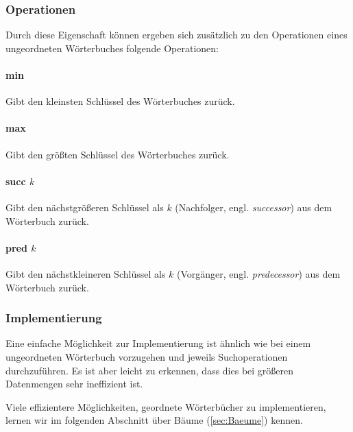 \subsubsection{Operationen}
Durch diese Eigenschaft können ergeben sich zusätzlich zu den Operationen eines ungeordneten Wörterbuches folgende Operationen:

\paragraph{min} Gibt den kleinsten Schlüssel des Wörterbuches zurück.
\paragraph{max} Gibt den größten Schlüssel des Wörterbuches zurück.
\paragraph{succ $k$} Gibt den nächstgrößeren Schlüssel als $k$ (Nachfolger, engl. \textit{successor}) aus dem Wörterbuch zurück.
\paragraph{pred $k$} Gibt den nächstkleineren Schlüssel als $k$ (Vorgänger, engl. \textit{predecessor}) aus dem Wörterbuch zurück.

\subsubsection{Implementierung}

Eine einfache Möglichkeit zur Implementierung ist ähnlich wie bei einem ungeordneten Wörterbuch vorzugehen und jeweils Suchoperationen durchzuführen.
Es ist aber leicht zu erkennen, dass dies bei größeren Datenmengen sehr ineffizient ist.

Viele effizientere Möglichkeiten, geordnete Wörterbücher zu implementieren,
lernen wir im folgenden Abschnitt über Bäume (\ref{sec:Baeume}) kennen.
